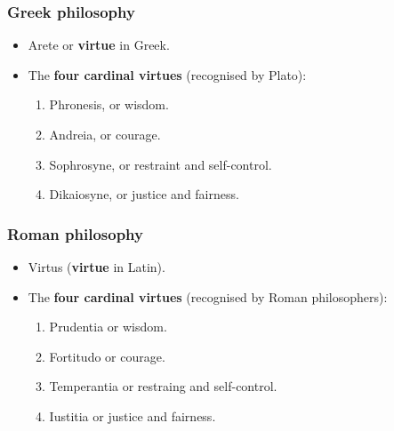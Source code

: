 \documentclass[11pt]{article}
\begin{document}
\subsubsection{Greek philosophy}
\label{sec:orga7ea514}
\begin{itemize}
\item Arete or \textbf{virtue} in Greek.
\item The \textbf{four cardinal virtues} (recognised by Plato):
\begin{enumerate}
\item Phronesis, or wisdom.
\item Andreia, or courage.
\item Sophrosyne, or restraint and self-control.
\item Dikaiosyne, or justice and fairness.
\end{enumerate}
\end{itemize}
\subsubsection{Roman philosophy}
\label{sec:orgb83cbe4}
\begin{itemize}
\item Virtus (\textbf{virtue} in Latin).
\item The \textbf{four cardinal virtues} (recognised by Roman philosophers):
\begin{enumerate}
\item Prudentia or wisdom.
\item Fortitudo or courage.
\item Temperantia or restraing and self-control.
\item Iustitia or justice and fairness.
\end{enumerate}
\end{itemize}
\end{document}
